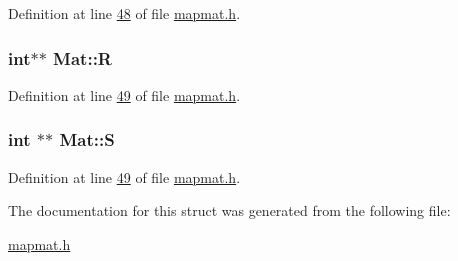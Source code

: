 Definition at line \hyperlink{mapmat_8h_source_l00048}{48} of file \hyperlink{mapmat_8h_source}{mapmat.\-h}.

\hypertarget{structMat_a162f62ae4515e7d13f7de19c3bdb5583}{
\subsubsection[{R}]{\setlength{\rightskip}{0pt plus 5cm}int$\ast$$\ast$ Mat\-::\-R}}\label{structMat_a162f62ae4515e7d13f7de19c3bdb5583}


Definition at line \hyperlink{mapmat_8h_source_l00049}{49} of file \hyperlink{mapmat_8h_source}{mapmat.\-h}.

\hypertarget{structMat_a1a774da8e5eb2c07a70491f3b14b96c7}{
\subsubsection[{S}]{\setlength{\rightskip}{0pt plus 5cm}int $\ast$$\ast$ Mat\-::\-S}}\label{structMat_a1a774da8e5eb2c07a70491f3b14b96c7}


Definition at line \hyperlink{mapmat_8h_source_l00049}{49} of file \hyperlink{mapmat_8h_source}{mapmat.\-h}.



The documentation for this struct was generated from the following file\-:\begin{DoxyCompactItemize}
\item 
\hyperlink{mapmat_8h}{mapmat.\-h}\end{DoxyCompactItemize}
